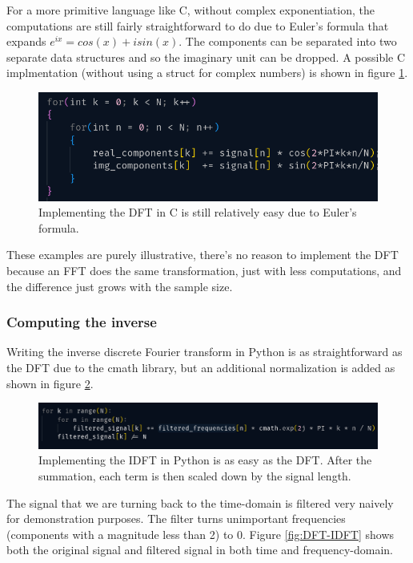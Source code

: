 For a more primitive language like C, without complex exponentiation, the computations are still fairly straightforward to do due to Euler's formula that expands $e^{ix} = cos(x) + isin(x)$. The components can be separated into two separate data structures and so the imaginary unit can be dropped. A possible C implmentation (without using a struct for complex numbers) is shown in figure \ref{fig:cDFT}. 

\begin{figure}[ht]
    \centering
    \includegraphics[width=\textwidth]{./images/cDFT.png}
    \caption{Implementing the DFT in C is still relatively easy due to Euler's formula. \label{fig:cDFT}}
\end{figure}

These examples are purely illustrative, there's no reason to implement the DFT because an FFT does the same transformation, just with less computations, and the difference just grows with the sample size.
\subsubsection{Computing the inverse}
Writing the inverse discrete Fourier transform in Python is as straightforward as the DFT due to the cmath library, but an additional normalization is added as shown in figure \ref{fig:IDFT}. 

\begin{figure}[ht]
    \centering
    \includegraphics[width=\textwidth]{./images/IDFT.png}
    \caption{Implementing the IDFT in Python is as easy as the DFT. After the summation, each term is then scaled down by the signal length. \label{fig:IDFT}}
\end{figure}

The signal that we are turning back to the time-domain is filtered very naively for demonstration purposes. The filter turns unimportant frequencies (components with a magnitude less than 2) to 0. Figure \ref{fig:DFT-IDFT} shows both the original signal and filtered signal in both time and frequency-domain.

